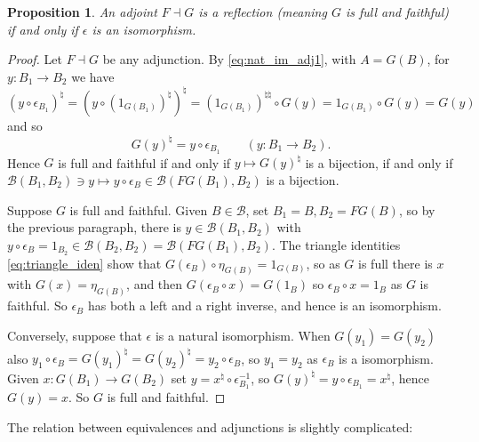 \documentclass[a4paper,11pt]{article}
\theoremstyle{plain}
\newtheorem{proposition}{Proposition}[section]
\theoremstyle{remark}
\newcommand{\mc}[1]{\mathcal{#1}}
\begin{document}
\begin{proposition}\label{prop:reflection_ff}
An adjoint $F \dashv G$ is a \emph{reflection} (meaning $G$ is full and faithful) if and only if $\epsilon$ is an isomorphism.
\end{proposition}
\begin{proof}
Let $F\dashv G$ be any adjunction.  By \eqref{eq:nat_im_adj1}, with $A=G(B)$, for $y\colon B_1\to B_2$ we have $(y\circ\epsilon_{B_1})^\natural = (y \circ (1_{G(B_1)})^\natural)^\natural = (1_{G(B_1)})^{\natural\natural} \circ G(y) = 1_{G(B_1)} \circ G(y) = G(y)$ and so
\[ G(y)^\natural = y \circ \epsilon_{B_1} \qquad (y\colon B_1 \to B_2). \]
Hence $G$ is full and faithful if and only if $y \mapsto G(y)^\natural$ is a bijection, if and only if $\mc 
B(B_1,B_2) \ni y \mapsto y \circ \epsilon_B \in \mc B(FG(B_1), B_2)$ is a bijection.

Suppose $G$ is full and faithful.  Given $B\in\mc B$, set $B_1=B, B_2=FG(B)$, so by the previous paragraph, there is $y\in\mc B(B_1, B_2)$ with $y\circ\epsilon_B = 1_{B_2} \in \mc B(B_2, B_2) = \mc B(FG(B_1), B_2)$.
The triangle identities \eqref{eq:triangle_iden} show that $G(\epsilon_B) \circ \eta_{G(B)} = 1_{G(B)}$, so as $G$ is full there is $x$ with $G(x) = \eta_{G(B)}$, and then $G(\epsilon_B \circ x) = G(1_B)$ so $\epsilon_B \circ x=1_B$ as $G$ is faithful.  So $\epsilon_B$ has both a left and a right inverse, and hence is an isomorphism.

Conversely, suppose that $\epsilon$ is a natural isomorphism.  When $G(y_1) = G(y_2)$ also $y_1 \circ \epsilon_B = G(y_1)^\natural = G(y_2)^\natural = y_2 \circ \epsilon_B$, so $y_1=y_2$ as $\epsilon_B$ is a isomorphism.  Given $x\colon G(B_1) \to G(B_2)$ set $y = x^\natural \circ \epsilon_{B_1}^{-1}$, so $G(y)^\natural = y \circ \epsilon_{B_1} = x^\natural$, hence $G(y) = x$.  So $G$ is full and faithful.
\end{proof}

The relation between equivalences and adjunctions is slightly complicated:
\end{document}
